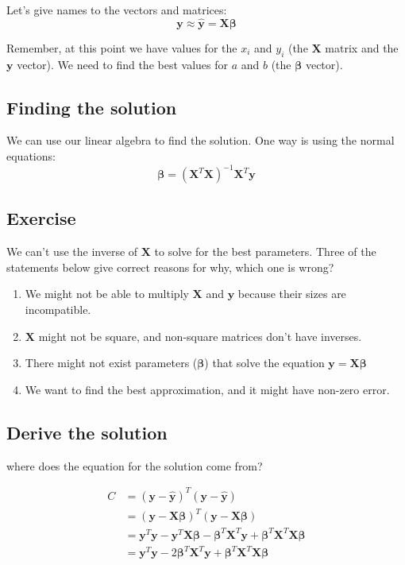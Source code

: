 \documentclass[11pt]{article}
\newcommand\xmtx{\boldsymbol{X}}
\newcommand\betavec{\boldsymbol{\beta}}
\newcommand\yvec{\boldsymbol{y}}
\newcommand\yhatvec{\boldsymbol{\hat{y}}}
\begin{document}
Let's give names to the vectors and matrices:
\begin{equation}
    \yvec \approx \yhatvec = \xmtx \betavec
\end{equation}

Remember, at this point we have values for the $x_i$ and $y_i$ (the
$\xmtx$ matrix and the $\yvec$ vector). We need to find the best values
for $a$ and $b$ (the $\betavec$ vector).

\subsection{Finding the solution}

We can use our linear algebra to find the solution. One way is using the normal equations:
\begin{equation}
    \betavec = (\xmtx^T \xmtx)^{-1} \xmtx^T \yvec
\end{equation}

\subsection{ Exercise }

We can't use the inverse of $\xmtx$ to solve for the best parameters.
Three of the statements below give correct reasons for why, which one is
wrong?

\begin{enumerate}
    \item We might not be able to multiply $\xmtx$ and $\yvec$ because their sizes are
        incompatible.
    \item $\xmtx$ might not be square, and non-square matrices don't
        have inverses.
    \item There might not exist parameters ($\betavec$) that solve the equation
        $\yvec = \xmtx \betavec$
    \item We want to find the best approximation, and it might have non-zero error.
\end{enumerate}


\subsection{ Derive the solution }

where does the equation for the solution come from?

\begin{equation}
    \begin{aligned}
        C &= ( \yvec - \yhatvec )^T( \yvec - \yhatvec ) \\
          &= ( \yvec - \xmtx \betavec )^T( \yvec - \xmtx\betavec ) \\
          &= \yvec^T \yvec  - \yvec^T \xmtx \betavec - \betavec^T \xmtx^T \yvec + 
                \betavec^T \xmtx^T \xmtx \betavec \\
          &= \yvec^T \yvec  - 2 \betavec^T \xmtx^T \yvec + \betavec^T \xmtx^T \xmtx \betavec 
    \end{aligned}
\end{equation}
\end{document}
